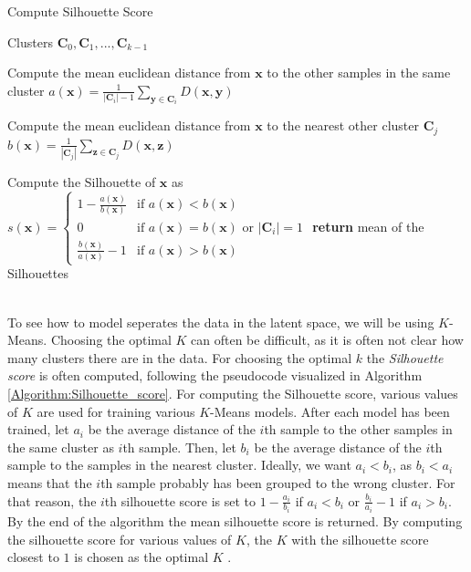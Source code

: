 \documentclass[./main.tex]{subfiles}
\begin{document}
\begin{algorithm}[htbp]
    \caption{Compute Silhouette Score \cite{MAD_L12}}
    \label{Algorithm:Silhouette_score}
    \begin{algorithmic}[1]
        \Require Clusters $\bm{C}_0, \bm{C}_1, ..., \bm{C}_{k - 1}$
                \State \begin{varwidth}[t]{\linewidth}
                    Compute the mean euclidean distance from $\bm{x}$ to the other samples in the same cluster $a(\bm{x}) = \frac{1}{|\bm{C}_i| - 1} \sum_{\bm{y} \in \bm{C}_i} D(\bm{x}, \bm{y})$
                \end{varwidth}
                \State \begin{varwidth}[t]{\linewidth}
                Compute the mean euclidean distance from $\bm{x}$ to the nearest other cluster $\bm{C}_j$ $b(\bm{x}) = \frac{1}{| \bm{C}_j |} \sum_{\bm{z} \in \bm{C}_j} D(\bm{x}, \bm{z})$
                \end{varwidth}
                \State Compute the Silhouette of $\bm{x}$ as
                \begin{math}
                    s(\bm{x}) =
                    \begin{cases}
                        1 - \frac{a(\bm{x})}{b(\bm{x})} & \text{if } a(\bm{x}) < b(\bm{x}) \\
                        0 & \text{if } a(\bm{x}) = b(\bm{x}) \text{ or } |\bm{C}_i| = 1 \\
                        \frac{b(\bm{x})}{a(\bm{x})} - 1 & \text{if } a(\bm{x}) > b(\bm{x})
                    \end{cases}
                \end{math}
            \EndFor
        \EndFor
        \State \textbf{return} mean of the Silhouettes
    \end{algorithmic}
\end{algorithm}
\\
To see how to model seperates the data in the latent space, we will be using $K$-Means. Choosing the optimal $K$ can often be difficult, as it is often not clear how many clusters there are in the data. For choosing the optimal $k$ the \textit{Silhouette score} is often computed, following the pseudocode visualized in Algorithm \ref{Algorithm:Silhouette_score}. For computing the Silhouette score, various values of $K$ are used for training various $K$-Means models. After each model has been trained, let $a_i$ be the average distance of the $i$th sample to the other samples in the same cluster as $i$th sample. Then, let $b_i$ be the average distance of the $i$th sample to the samples in the nearest cluster. Ideally, we want $a_i < b_i$, as $b_i < a_i$ means that the $i$th sample probably has been grouped to the wrong cluster. For that reason, the $i$th silhouette score is set to $1 - \frac{a_i}{b_i}$ if $a_i < b_i$ or $\frac{b_i}{a_i} - 1$ if $a_i > b_i$. By the end of the algorithm the mean silhouette score is returned. By computing the silhouette score for various values of $K$, the $K$ with the silhouette score closest to $1$ is chosen as the optimal $K$ \cite{MAD_L12}.
\end{document}
